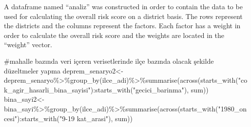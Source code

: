\documentclass[
  11pt,
  a4paper,
  DIV=11,
  numbers=noendperiod]{scrartcl}
\newenvironment{Shaded}{\begin{snugshade}}{\end{snugshade}}
\newcommand{\CommentTok}[1]{\textcolor[rgb]{0.37,0.37,0.37}{#1}}
\newcommand{\FunctionTok}[1]{\textcolor[rgb]{0.28,0.35,0.67}{#1}}
\newcommand{\NormalTok}[1]{\textcolor[rgb]{0.00,0.23,0.31}{#1}}
\newcommand{\OtherTok}[1]{\textcolor[rgb]{0.00,0.23,0.31}{#1}}
\newcommand{\SpecialCharTok}[1]{\textcolor[rgb]{0.37,0.37,0.37}{#1}}
\newcommand{\StringTok}[1]{\textcolor[rgb]{0.13,0.47,0.30}{#1}}
\begin{document}
A dataframe named ``analiz'' was constructed in order to contain the
data to be used for calculating the overall risk score on a district
basis. The rows represent the districts and the columns represent the
factors. Each factor has a weight in order to calculate the overall risk
score and the weights are located in the ``weight'' vector.

\begin{Shaded}
\begin{Highlighting}[]
\CommentTok{\#mahalle bazında veri içeren verisetlerinde ilçe bazında olacak şekilde düzeltmeler yapma}
\NormalTok{deprem\_senaryo2}\OtherTok{\textless{}{-}}\NormalTok{deprem\_senaryo}\SpecialCharTok{\%\textgreater{}\%}\FunctionTok{group\_by}\NormalTok{(ilce\_adi)}\SpecialCharTok{\%\textgreater{}\%}\FunctionTok{summarise}\NormalTok{(}\FunctionTok{across}\NormalTok{(}\FunctionTok{starts\_with}\NormalTok{(}\StringTok{"cok\_agir\_hasarli\_bina\_sayisi"}\NormalTok{)}\SpecialCharTok{:}\FunctionTok{starts\_with}\NormalTok{(}\StringTok{"gecici\_barinma"}\NormalTok{), sum))}
\NormalTok{bina\_sayi2}\OtherTok{\textless{}{-}}\NormalTok{bina\_sayi}\SpecialCharTok{\%\textgreater{}\%}\FunctionTok{group\_by}\NormalTok{(ilce\_adi)}\SpecialCharTok{\%\textgreater{}\%}\FunctionTok{summarise}\NormalTok{(}\FunctionTok{across}\NormalTok{(}\FunctionTok{starts\_with}\NormalTok{(}\StringTok{"1980\_oncesi"}\NormalTok{)}\SpecialCharTok{:}\FunctionTok{starts\_with}\NormalTok{(}\StringTok{"9{-}19 kat\_arasi"}\NormalTok{), sum))}


\end{Highlighting}
\end{Shaded}
\end{document}
